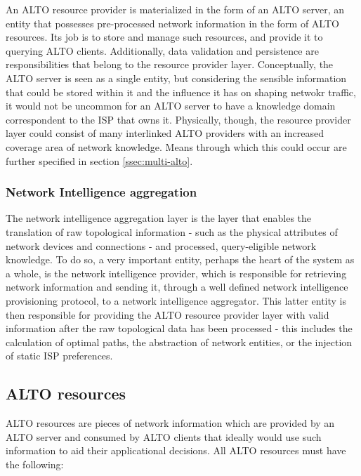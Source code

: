 An ALTO resource provider is materialized in the form of an ALTO server, an entity that possesses pre-processed network information in the form of ALTO resources. Its job is to store and manage such resources, and provide it to querying ALTO clients. Additionally, data validation and persistence are responsibilities that belong to the resource provider layer. Conceptually, the ALTO server is seen as a single entity, but considering the sensible information that could be stored within it and the influence it has on shaping netwokr traffic, it would not be uncommon for an ALTO server to have a knowledge domain correspondent to the ISP that owns it. Physically, though, the resource provider layer could consist of many interlinked ALTO providers with an increased coverage area of network knowledge. Means through which this could occur are further specified in section \ref{ssec:multi-alto}.

\subsubsection{Network Intelligence aggregation}

The network intelligence aggregation layer is the layer that enables the translation of raw topological information - such as the physical attributes of network devices and connections - and processed, query-eligible network knowledge. To do so, a very important entity, perhaps the heart of the system as a whole, is the network intelligence provider, which is responsible for retrieving network information and sending it, through a well defined network intelligence provisioning protocol, to a network intelligence aggregator. This latter entity is then responsible for providing the ALTO resource provider layer with valid information after the raw topological data has been processed - this includes the calculation of optimal paths, the abstraction of network entities, or the injection of static ISP preferences.


\subsection{ALTO resources}
\label{ssec:alto-resources}

ALTO resources are pieces of network information which are provided by an ALTO server and consumed by ALTO clients that ideally would use such information to aid their applicational decisions. All ALTO resources must have the following:

